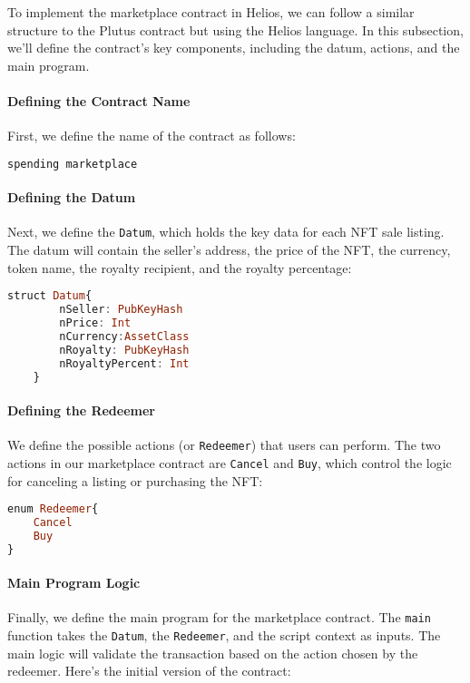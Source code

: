 To implement the marketplace contract in Helios, we can follow a similar structure to the Plutus contract but using the Helios language. In this subsection, we'll define the contract's key components, including the datum, actions, and the main program.

\paragraph{Defining the Contract Name}
First, we define the name of the contract as follows:

\begin{lstlisting}[language=haskell, caption=Contract Name Definition]
spending marketplace
\end{lstlisting}

\paragraph{Defining the Datum}
Next, we define the \texttt{Datum}, which holds the key data for each NFT sale listing. The datum will contain the seller's address, the price of the NFT, the currency, token name, the royalty recipient, and the royalty percentage:

\begin{lstlisting}[language=haskell, caption=Datum Definition]
    struct Datum{
        nSeller: PubKeyHash
        nPrice: Int
        nCurrency:AssetClass
        nRoyalty: PubKeyHash
        nRoyaltyPercent: Int
    }
\end{lstlisting}

\paragraph{Defining the Redeemer}
We define the possible actions (or \texttt{Redeemer}) that users can perform. The two actions in our marketplace contract are \texttt{Cancel} and \texttt{Buy}, which control the logic for canceling a listing or purchasing the NFT:

\begin{lstlisting}[language=haskell, caption=Redeemer Definition]
enum Redeemer{
    Cancel
    Buy
}
\end{lstlisting}

\paragraph{Main Program Logic}
Finally, we define the main program for the marketplace contract. The \texttt{main} function takes the \texttt{Datum}, the \texttt{Redeemer}, and the script context as inputs. The main logic will validate the transaction based on the action chosen by the redeemer. Here’s the initial version of the contract:

